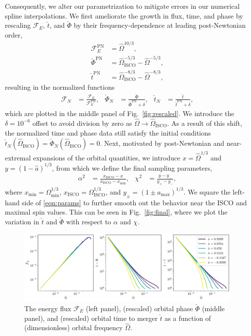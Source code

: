\documentclass[%
 reprint,
 nofootinbib,
 amsmath,amssymb,
 aps,
 prd,
]{revtex4-2}
\begin{document}
Consequently, we alter our parametrization to mitigate errors in our numerical spline interpolations. We first ameliorate the growth in flux, time, and phase by rescaling $\mathcal{F}_E$, $\check{t}$, and $\check{\Phi}$ by their frequency-dependence at leading post-Newtonian order,
\begin{align}
    \mathcal{F}_E^\mathrm{PN} &= \hat{\Omega}^{10/3},
    \\
    \check{\Phi}^\mathrm{PN} &= \hat{\Omega}_\mathrm{ISCO}^{-5/3} - \hat{\Omega}^{-5/3},
    \\
    \check{t}^\mathrm{PN} &= \hat{\Omega}_\mathrm{ISCO}^{-8/3} - \hat{\Omega}^{-8/3},
\end{align}
resulting in the normalized functions
\begin{align}
    \mathcal{F}_N &= \frac{\mathcal{F}_E}{\mathcal{F}_E^\mathrm{PN}},
    &
    \check{\Phi}_N &= \frac{\check{\Phi}}{ \check{\Phi}^\mathrm{PN} + \delta},
    &
    \check{t}_N &= \frac{\check{t}}{\check{t}^\mathrm{PN} + \delta},
\end{align}
which are plotted in the middle panel of Fig.~\ref{fig:rescaled}. We introduce the $\delta = 10^{-6}$ offset to avoid division by zero as $\hat{\Omega} \rightarrow \hat{\Omega}_\mathrm{ISCO}$. As a result of this shift, the normalized time and phase data still satisfy the initial conditions $\check{t}_N(\hat{\Omega}_\mathrm{ISCO}) = \check{\Phi}_N(\hat{\Omega}_\mathrm{ISCO}) = 0$. Next, motivated by post-Newtonian and near-extremal expansions of the orbital quantities, we introduce $x = \hat{\Omega}^{1/3}$ and $y = (1 - \hat{a})^{1/3}$, from which we define the final sampling parameters,
\begin{align} \label{eqn:params}
    \alpha^2 &= \frac{x_\mathrm{ISCO}-x}{x_\mathrm{ISCO}-x_\mathrm{min}},
    &
    \chi^2 &= \frac{y-y_-}{y_+-y_-},
\end{align}
where $x_\mathrm{min} = \Omega_\mathrm{min}^{1/3}$, $x_\mathrm{ISCO} = \Omega_\mathrm{ISCO}^{1/3}$, and $y_\pm = (1 \pm a_\mathrm{max})^{1/3}$. We square the left-hand side of \eqref{eqn:params} to further smooth out the behavior near the ISCO and maximal spin values. This can be seen in Fig.~\ref{fig:final}, where we plot the variation in $\check{t}$ and $\check{\Phi}$ with respect to $\alpha$ and $\chi$.

\begin{figure}[!htp]
    \centering
    \includegraphics[width=0.95\linewidth]{figures/orginal_parametrization.pdf}
    \caption{The energy flux $\mathcal{F}_E$ (left panel), (rescaled) orbital phase $\check{\Phi}$ (middle panel), and (rescaled) orbital time to merger $\check{t}$ as a function of (dimensionless) orbital frequency $\hat{\Omega}$.}
    \label{fig:original}
\end{figure}
\end{document}
